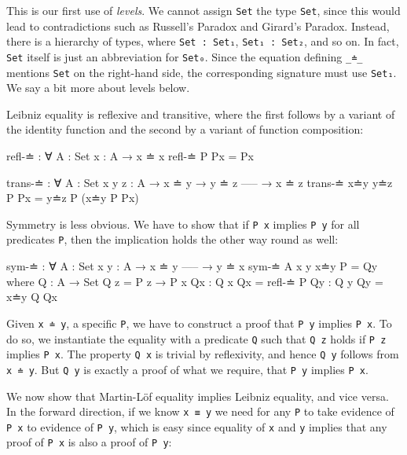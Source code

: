 This is our first use of \emph{levels}. We cannot assign \texttt{Set}
the type \texttt{Set}, since this would lead to contradictions such as
Russell's Paradox and Girard's Paradox. Instead, there is a hierarchy of
types, where \texttt{Set\ :\ Set₁}, \texttt{Set₁\ :\ Set₂}, and so on.
In fact, \texttt{Set} itself is just an abbreviation for \texttt{Set₀}.
Since the equation defining \texttt{\_≐\_} mentions \texttt{Set} on the
right-hand side, the corresponding signature must use \texttt{Set₁}. We
say a bit more about levels below.

Leibniz equality is reflexive and transitive, where the first follows by
a variant of the identity function and the second by a variant of
function composition:

\begin{fence}
\begin{code}
refl-≐ : ∀ {A : Set} {x : A}
  → x ≐ x
refl-≐ P Px  =  Px

trans-≐ : ∀ {A : Set} {x y z : A}
  → x ≐ y
  → y ≐ z
    -----
  → x ≐ z
trans-≐ x≐y y≐z P Px  =  y≐z P (x≐y P Px)
\end{code}
\end{fence}

Symmetry is less obvious. We have to show that if \texttt{P\ x} implies
\texttt{P\ y} for all predicates \texttt{P}, then the implication holds
the other way round as well:

\begin{fence}
\begin{code}
sym-≐ : ∀ {A : Set} {x y : A}
  → x ≐ y
    -----
  → y ≐ x
sym-≐ {A} {x} {y} x≐y P  =  Qy
  where
    Q : A → Set
    Q z = P z → P x
    Qx : Q x
    Qx = refl-≐ P
    Qy : Q y
    Qy = x≐y Q Qx
\end{code}
\end{fence}

Given \texttt{x\ ≐\ y}, a specific \texttt{P}, we have to construct a
proof that \texttt{P\ y} implies \texttt{P\ x}. To do so, we instantiate
the equality with a predicate \texttt{Q} such that \texttt{Q\ z} holds
if \texttt{P\ z} implies \texttt{P\ x}. The property \texttt{Q\ x} is
trivial by reflexivity, and hence \texttt{Q\ y} follows from
\texttt{x\ ≐\ y}. But \texttt{Q\ y} is exactly a proof of what we
require, that \texttt{P\ y} implies \texttt{P\ x}.

We now show that Martin-Löf equality implies Leibniz equality, and vice
versa. In the forward direction, if we know \texttt{x\ ≡\ y} we need for
any \texttt{P} to take evidence of \texttt{P\ x} to evidence of
\texttt{P\ y}, which is easy since equality of \texttt{x} and \texttt{y}
implies that any proof of \texttt{P\ x} is also a proof of
\texttt{P\ y}:

